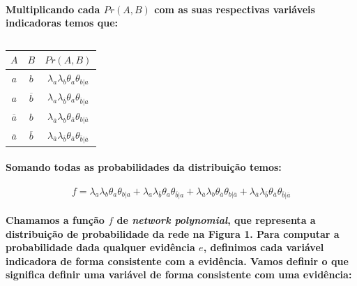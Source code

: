 \documentclass[a4paper,10pt]{article}
\theoremstyle{plain}
\begin{document}
\newpage

\paragraph{
  Multiplicando cada $Pr(A, B)$ com as suas respectivas variáveis indicadoras temos que:
}

\begin{table}[h]
\begin{center}
\captionsetup{justification=centering}
\caption{}
\begin{tabular}{c c | c}
$A$ & $B$ & $Pr(A, B)$ \\
\hline
$a$ & $b$ & $\lambda_{a}\lambda_{b}\theta_{a}\theta_{b|a}$ \\
$a$ & $\overline{b}$ & $\lambda_{a}\lambda_{\overline{b}}\theta_{a}\theta_{\overline{b}|a}$ \\
$\overline{a}$ & $b$ & $\lambda_{\overline{a}}\lambda_{b}\theta_{\overline{a}}\theta_{b|\overline{a}}$ \\
$\overline{a}$ & $\overline{b}$ & $\lambda_{\overline{a}}\lambda_{\overline{b}}\theta_{\overline{a}}\theta_{\overline{b}|\overline{a}}$ \\
\end{tabular}
\end{center}
\end{table}

\paragraph{
  Somando todas as probabilidades da distribuição temos:
}

\begin{equation}
f = \lambda_{a}\lambda_{b}\theta_{a}\theta_{b|a} +
  \lambda_{a}\lambda_{\overline{b}}\theta_{a}\theta_{\overline{b}|a} +
  \lambda_{\overline{a}}\lambda_{b}\theta_{\overline{a}}\theta_{b|\overline{a}} +
  \lambda_{\overline{a}}\lambda_{\overline{b}}\theta_{\overline{a}}\theta_{\overline{b}|\overline{a}}
\end{equation}

\paragraph{
  Chamamos a função $f$ de \textit{network polynomial}, que representa a distribuição de
probabilidade da rede na Figura 1. Para computar a probabilidade dada qualquer evidência $e$,
definimos cada variável indicadora de forma consistente com a evidência. Vamos definir o que
significa definir uma variável de forma consistente com uma evidência:
}
\end{document}
